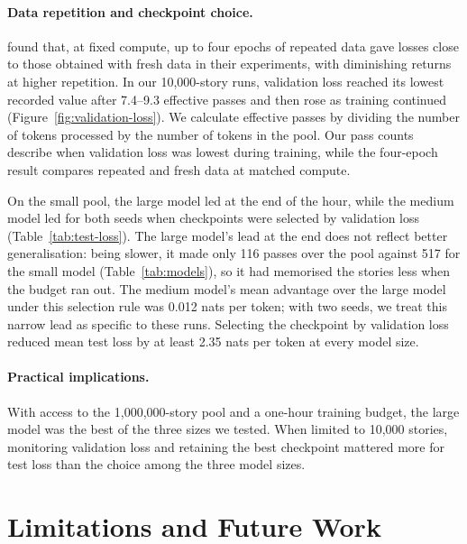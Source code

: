 \documentclass[12pt]{article}
\begin{document}
\paragraph{Data repetition and checkpoint choice.}
\citet{muennighoff2023scaling} found that, at fixed compute, up to
four epochs of repeated data gave losses close to those obtained
with fresh data in their experiments, with diminishing returns
at higher repetition. In our 10,000-story runs, validation loss
reached its lowest recorded value after 7.4--9.3 effective passes
and then rose as training continued (Figure~\ref{fig:validation-loss}).
We calculate effective passes by dividing the number of tokens
processed by the number of tokens in the pool. Our pass counts
describe when validation loss was lowest during training, while
the four-epoch result compares repeated and fresh data at
matched compute.

On the small pool, the large model led at the end of the hour,
while the medium model led for both seeds when checkpoints were
selected by validation loss (Table~\ref{tab:test-loss}). The large model's lead at the end does not reflect better generalisation: being slower, it made only 116 passes over the pool against 517 for the small model (Table~\ref{tab:models}), so it had memorised the stories less when the budget ran out. The
medium model's mean advantage over the large model under this
selection rule was 0.012 nats per token; with two seeds, we treat
this narrow lead as specific to these runs. Selecting the checkpoint
by validation loss reduced mean test loss by at least 2.35 nats
per token at every model size.

\paragraph{Practical implications.}
With access to the 1,000,000-story pool and a one-hour training
budget, the large model was the best of the three sizes we
tested. When limited to 10,000 stories, monitoring validation
loss and retaining the best checkpoint mattered more for test
loss than the choice among the three model sizes.

\section{Limitations and Future Work}
\label{sec:limitations}
\end{document}
